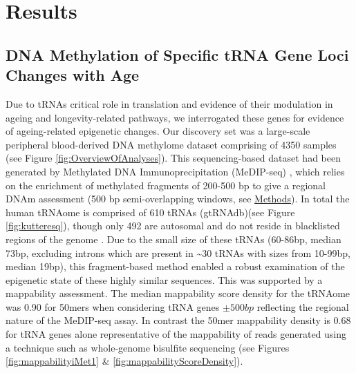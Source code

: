\documentclass[]{book}
\begin{document}
\newpage

\hypertarget{res}{%
\section{Results}\label{res}}

\hypertarget{dna-methylation-of-specific-trna-gene-loci-changes-with-age}{%
\subsection{DNA Methylation of Specific tRNA Gene Loci Changes with Age}\label{dna-methylation-of-specific-trna-gene-loci-changes-with-age}}

Due to tRNAs critical role in translation and evidence of their modulation in ageing and longevity-related pathways, we interrogated these genes for evidence of ageing-related epigenetic changes.
Our discovery set was a large-scale peripheral blood-derived DNA methylome dataset comprising of 4350 samples (see Figure \ref{fig:OverviewOfAnalyses}).
This sequencing-based dataset had been generated by Methylated DNA Immunoprecipitation (MeDIP-seq) \citep{Down2009}, which relies on the enrichment of methylated fragments of 200-500 bp to give a regional DNAm assessment (500 bp semi-overlapping windows, see \protect\hyperlink{EpiTwinsMethods}{Methods}).
In total the human tRNAome is comprised of 610 tRNAs (gtRNAdb)(see Figure \ref{fig:kutteresq}), though only 492 are autosomal and do not reside in blacklisted regions of the genome \citep{Amemiya2019}.
Due to the small size of these tRNAs (60-86bp, median 73bp, excluding introns which are present in \textasciitilde30 tRNAs with sizes from 10-99bp, median 19bp), this fragment-based method enabled a robust examination of the epigenetic state of these highly similar sequences.
This was supported by a mappability assessment.
The median mappability score density for the tRNAome was 0.90 for 50mers when considering tRNA genes \(\pm500bp\) reflecting the regional nature of the MeDIP-seq assay.
In contrast the 50mer mappability density is 0.68 for tRNA genes alone representative of the mappability of reads generated using a technique such as whole-genome bisulfite sequencing (see Figures \ref{fig:mappabilityiMet1} \& \ref{fig:mappabilityScoreDensity}).
\end{document}
